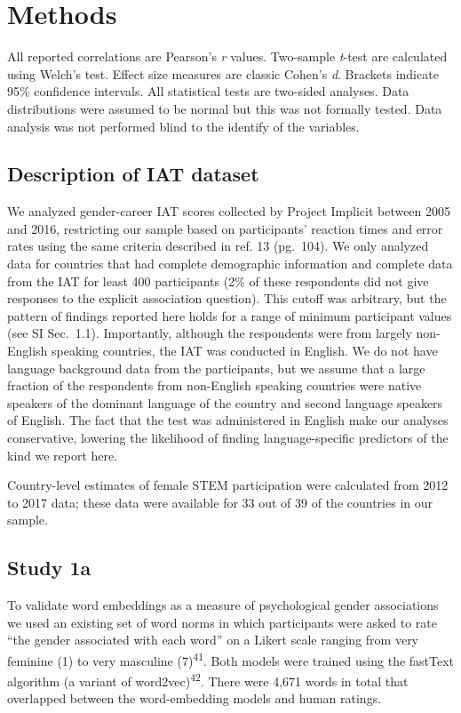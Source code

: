 \documentclass[9pt,twocolumn]{pnas-new}
\begin{document}
\section*{Methods}

All reported correlations are Pearson's \emph{r} values.  Two-sample \emph{t}-test are calculated using Welch's test. Effect size measures are classic Cohen's \emph{d}.  Brackets indicate 95\% confidence intervals. All statistical tests are two-sided analyses. Data distributions were assumed to be normal but this was not formally tested. Data analysis was not performed blind to the identify of the variables.
 
\subsection*{Description of IAT dataset}

We analyzed gender-career IAT scores collected by Project Implicit
between 2005 and 2016, restricting our sample based on participants'
reaction times and error rates using the same criteria described in ref. 13 (pg.~104). We only analyzed data for
countries that had complete demographic information and complete data
from the IAT for least 400 participants (2\% of these respondents did
not give responses to the explicit association question). This cutoff was
arbitrary, but the pattern of findings reported here holds for a range
of minimum participant values (see
SI Sec.\ 1.1).  Importantly, although the
respondents were from largely non-English speaking countries, the IAT
was conducted in English. We do not have language background data from
the participants, but we assume that a large fraction of the respondents
from non-English speaking countries were native speakers of the dominant
language of the country and second language speakers of English. The fact that the test was administered in English make our analyses conservative, lowering the likelihood of finding language-specific predictors of the kind we report here.

Country-level estimates of female STEM participation were calculated from 2012 to 2017 data; these data were available for 33 out of 39 of the countries in our sample.


\subsection*{Study 1a}


To validate word embeddings as a measure of psychological
gender associations we used an existing set of word norms in which participants
were asked to rate \enquote{the gender associated with each word} on a
Likert scale ranging from very feminine (1) to very
masculine (7)\textsuperscript{41}.  Both models were trained using the fastText algorithm (a variant of word2vec)\textsuperscript{42}. There were 4,671
words in total that overlapped between the word-embedding models and
human ratings.
\end{document}

